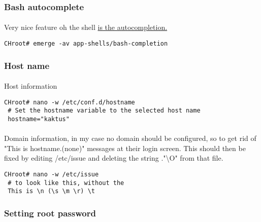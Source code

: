 \documentclass[10pt,a4paper]{article}
\begin{document}
                \newpage
                \subsubsection{Bash autocomplete}
                    \paragraph{} Very nice feature oh the shell  \href{https://wiki.gentoo.org/wiki/Bash#Tab_completion}{is the autocompletion.}

                    \begin{lstlisting}[style=BashInputCHRoot]
 CHroot# emerge -av app-shells/bash-completion
                    \end{lstlisting}
                
                \newpage
                \subsubsection{Host name}
                    \paragraph{} Host information
                    \begin{lstlisting}[style=BashInputCHRoot]
 CHroot# nano -w /etc/conf.d/hostname
 # Set the hostname variable to the selected host name
 hostname="kaktus"
                    \end{lstlisting}
                    
                    \paragraph{} Domain information, in my case no domain should be configured, so to get rid of "This is hostname.(none)" messages at their login screen. This should then be fixed by editing /etc/issue and deleting the string ."\textbackslash O" from that file.

                    \begin{lstlisting}[style=BashInputCHRoot]
 CHroot# nano -w /etc/issue
 # to look like this, without the 
 This is \n (\s \m \r) \t
                    \end{lstlisting}
                
                \newpage
                \subsubsection{Setting root password}
                    
\end{document}
